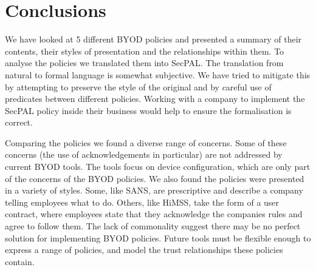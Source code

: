 \documentclass[conference,twocolumn]{IEEEtran}
\newcommand{\comment}[1]{}
\begin{document}
\section{Conclusions}
\label{sec:conclusions}

We have looked at 5 different BYOD policies and presented a summary of their contents, their styles of presentation and the relationships within them.
To analyse the policies we translated them into SecPAL.
The translation from natural to formal language is somewhat subjective.
We have tried to mitigate this by attempting to preserve the style of the original and by careful use of predicates between different policies.
Working with a company to implement the SecPAL policy inside their business would help to ensure the formalisation is correct.

Comparing the policies we found a diverse range of concerns.
Some of these concerns (the use of acknowledgements in particular) are not addressed by current BYOD tools. 
The tools focus on device configuration, which are only part of the concerns of the BYOD policies.
We also found the policies were presented in a variety of styles.
Some, like SANS, are prescriptive and describe a company telling employees what to do.
Others, like HiMSS, take the form of a user contract, where employees state that they acknowledge the companies rules and agree to follow them.
The lack of commonality suggest there may be no perfect solution for implementing BYOD policies.
Future tools must be flexible enough to express a range of policies, and model the trust relationships these policies contain.

\comment{%
\begin{itemize}
  \item Our formalisation of the policies is subjective.
  \item Remarks about lack of commonality.
\end{itemize}
}

\printbibliography{}
\end{document}

